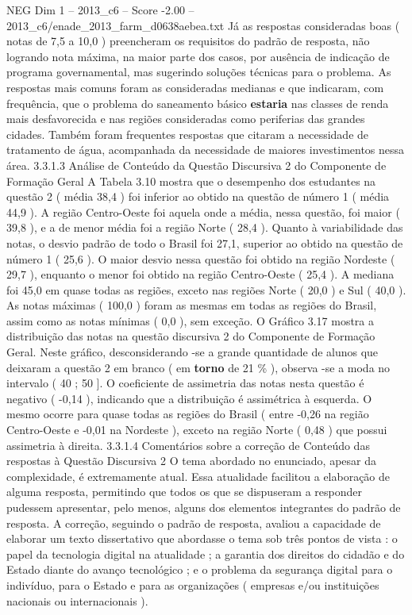 \begin{textsample}{NEG Dim 1 – 2013\_c6 – Score -2.00 – 2013\_c6/enade\_2013\_farm\_d0638aebea.txt}
Já as respostas consideradas boas ( notas de 7,5 a 10,0 ) preencheram os requisitos do padrão de resposta, não logrando nota máxima, na maior parte dos casos, por ausência de indicação de programa governamental, mas sugerindo soluções técnicas para o problema.
As respostas mais comuns foram as consideradas medianas e que indicaram, com frequência, que o problema do saneamento básico \textbf{estaria} nas classes de renda mais desfavorecida e nas regiões consideradas como periferias das grandes cidades.
Também foram frequentes respostas que citaram a necessidade de tratamento de água, acompanhada da necessidade de maiores investimentos nessa área. 3.3.1.3 Análise de Conteúdo da Questão Discursiva 2 do Componente de Formação Geral A Tabela 3.10 mostra que o desempenho dos estudantes na questão 2 ( média 38,4 ) foi inferior ao obtido na questão de número 1 ( média 44,9 ).
A região Centro-Oeste foi aquela onde a média, nessa questão, foi maior ( 39,8 ), e a de menor média foi a região Norte ( 28,4 ).
Quanto à variabilidade das notas, o desvio padrão de todo o Brasil foi 27,1, superior ao obtido na questão de número 1 ( 25,6 ).
O maior desvio nessa questão foi obtido na região Nordeste ( 29,7 ), enquanto o menor foi obtido na região Centro-Oeste ( 25,4 ).
A mediana foi 45,0 em quase todas as regiões, exceto nas regiões Norte ( 20,0 ) e Sul ( 40,0 ).
As notas máximas ( 100,0 ) foram as mesmas em todas as regiões do Brasil, assim como as notas mínimas ( 0,0 ), sem exceção.
O Gráfico 3.17 mostra a distribuição das notas na questão discursiva 2 do Componente de Formação Geral.
Neste gráfico, desconsiderando -se a grande quantidade de alunos que deixaram a questão 2 em branco ( em \textbf{torno} de 21 \% ), observa -se a moda no intervalo ( 40 ; 50 ].
O coeficiente de assimetria das notas nesta questão é negativo ( -0,14 ), indicando que a distribuição é assimétrica à esquerda.
O mesmo ocorre para quase todas as regiões do Brasil ( entre -0,26 na região Centro-Oeste e -0,01 na Nordeste ), exceto na região Norte ( 0,48 ) que possui assimetria à direita. 3.3.1.4 Comentários sobre a correção de Conteúdo das respostas à Questão Discursiva 2 O tema abordado no enunciado, apesar da complexidade, é extremamente atual.
Essa atualidade facilitou a elaboração de alguma resposta, permitindo que todos os que se dispuseram a responder pudessem apresentar, pelo menos, alguns dos elementos integrantes do padrão de resposta.
A correção, seguindo o padrão de resposta, avaliou a capacidade de elaborar um texto dissertativo que abordasse o tema sob três pontos de vista : o papel da tecnologia digital na atualidade ; a garantia dos direitos do cidadão e do Estado diante do avanço tecnológico ; e o problema da segurança digital para o indivíduo, para o Estado e para as organizações ( empresas e/ou instituições nacionais ou internacionais ).

\end{textsample}

